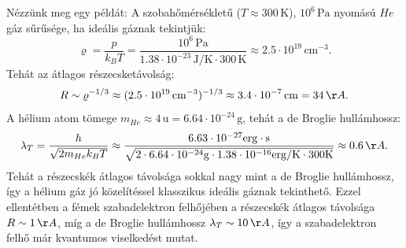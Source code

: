 \documentclass[../main.tex]{subfiles}
\begin{document}
Nézzünk meg egy példát: A szobahőmérsékletű ($T \approx 300 \, \mathrm{K}$), $10^6 \, \mathrm{Pa}$ nyomású $He$ gáz sűrűsége, ha ideális gáznak tekintjük:
\begin{equation}
    \varrho = \frac{p}{k_B T} = \frac{10^6 \, \mathrm{Pa}}{1.38 \cdot 10^{-23} \, \mathrm{J/K} \cdot 300 \, \mathrm{K}} \approx 2.5 \cdot 10^{19} \, \mathrm{cm^{-3}}.
\end{equation}
Tehát az átlagos részecsketávolság:
\begin{equation}
    R \sim \varrho^{-1/3} \approx (2.5 \cdot 10^{19} \, \mathrm{cm^{-3}})^{-1/3} \approx 3.4 \cdot 10^{-7} \, \mathrm{cm} = 34 \, \AA.
\end{equation}
A hélium atom tömege $m_{He} \approx 4 \, \mathrm{u} = 6.64 \cdot 10^{-24} \, \mathrm{g}$, tehát a de Broglie hullámhossz:
\begin{equation}
    \lambda_T = \frac{h}{\sqrt{2 m_{He} k_B T}} \approx \frac{6.63 \cdot 10^{-27} \mathrm{erg \cdot s}}{\sqrt{2 \cdot 6.64 \cdot 10^{-24} \mathrm{g} \cdot 1.38 \cdot 10^{-16} \mathrm{erg/K} \cdot 300 \mathrm{K}}} \approx 0.6 \, \AA.
\end{equation}
Tehát a részecskék átlagos távolsága sokkal nagy mint a de Broglie hullámhossz, így a hélium gáz jó közelítéssel klasszikus ideális gáznak tekinthető. Ezzel ellentétben a fémek szabadelektron felhőjében a 
részecskék átlagos távolsága $R \sim 1 \, \AA$, míg a de Broglie hullámhossz $ \lambda_T \sim 10 \, \AA$, így a szabadelektron felhő már kvantumos viselkedést mutat.
\end{document}
